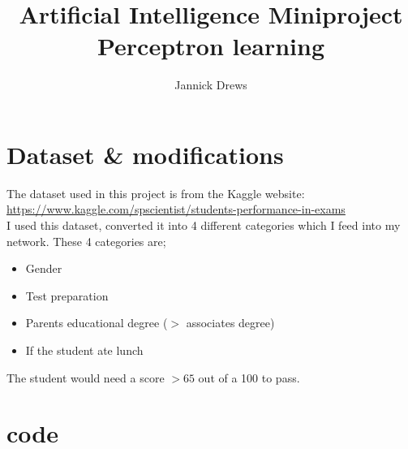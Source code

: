 \documentclass{article}
\title{Artificial Intelligence Miniproject\\Perceptron learning}
\author{Jannick Drews}
\begin{document}
\maketitle

\section{Dataset \& modifications}
The dataset used in this project is from the Kaggle website:
\url{
		https://www.kaggle.com/spscientist/students-performance-in-exams
	}\\
I used this dataset, converted it into 4 different categories which I feed into my network. These 4 categories are;
\begin{itemize}
	\item Gender
	\item Test preparation
	\item Parents educational degree ($>$ associates degree)
	\item If the student ate lunch
\end{itemize}
The student would need a score $> 65$ out of a 100 to pass.

\section{code}

\end{document}
